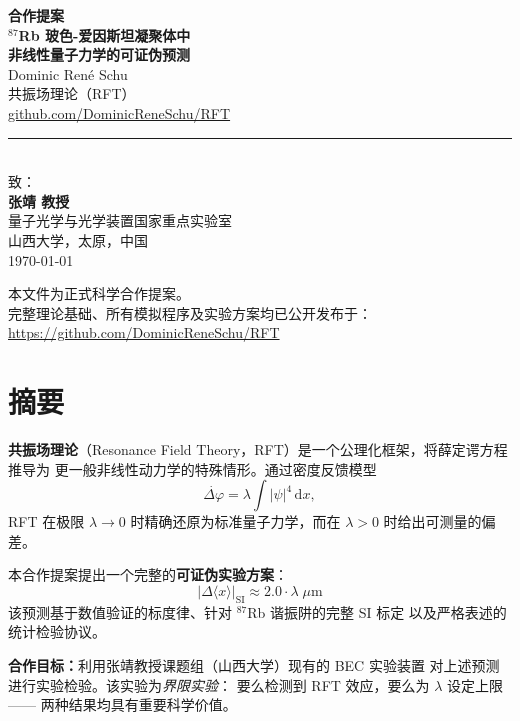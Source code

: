 \documentclass[a4paper,11pt]{article}
\begin{document}
\thispagestyle{empty}
\begin{center}
  {\LARGE\bfseries 合作提案}\\[0.5em]
  {\large\bfseries $^{87}$Rb 玻色-爱因斯坦凝聚体中\\
  非线性量子力学的可证伪预测}\\[2em]
  {\large Dominic Ren\'e Schu}\\[0.3em]
  {\normalsize 共振场理论（RFT）\\
  \href{https://github.com/DominicReneSchu/RFT}{github.com/DominicReneSchu/RFT}}\\[2em]
  \rule{0.6\textwidth}{0.4pt}\\[1em]
  {\normalsize 致：}\\[0.3em]
  {\large\bfseries 张靖 教授}\\
  {\normalsize 量子光学与光学装置国家重点实验室\\
  山西大学，太原，中国}\\[2em]
  {\normalsize \today}
\end{center}

\vfill
\begin{center}
\small
本文件为正式科学合作提案。\\
完整理论基础、所有模拟程序及实验方案均已公开发布于：\\
\href{https://github.com/DominicReneSchu/RFT}{https://github.com/DominicReneSchu/RFT}
\end{center}
\newpage

\section{摘要}

\textbf{共振场理论}（Resonance Field Theory，RFT）是一个公理化框架，将薛定谔方程推导为
更一般非线性动力学的特殊情形。通过密度反馈模型
\[
  \dot{\Delta\varphi} = \lambda \int |\psi|^4\,\mathrm{d}x,
\]
RFT 在极限 $\lambda \to 0$ 时精确还原为标准量子力学，而在 $\lambda > 0$ 时给出可测量的偏差。

本合作提案提出一个完整的\textbf{可证伪实验方案}：
\[
  \boxed{|\Delta\langle x\rangle|_{\mathrm{SI}} \approx 2{.}0 \cdot \lambda\;\mu\mathrm{m}}
\]
该预测基于数值验证的标度律、针对 $^{87}$Rb 谐振阱的完整 SI 标定
以及严格表述的统计检验协议。

\textbf{合作目标：}利用张靖教授课题组（山西大学）现有的 BEC 实验装置
对上述预测进行实验检验。该实验为\emph{界限实验}：
要么检测到 RFT 效应，要么为 $\lambda$ 设定上限——
两种结果均具有重要科学价值。
\end{document}
